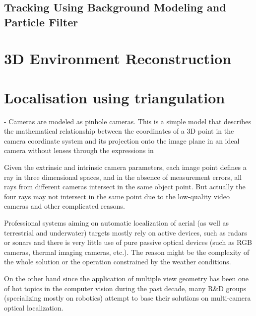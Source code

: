 \subsection{Tracking Using Background Modeling and Particle Filter}


\section{3D Environment Reconstruction}

\section{Localisation using triangulation}


- Cameras are modeled as pinhole cameras. This is a simple model that describes the mathematical
relationship between the coordinates of a 3D point in the camera coordinate system and its
projection onto the image plane in an ideal camera without lenses through the expressions in 


Given  the  extrinsic  and  intrinsic  camera 
parameters,  each  image  point  defines  a  ray  in  three 
dimensional spaces, and in the absence of measurement errors, 
all  rays  from  different  cameras  intersect  in  the  same  object 
point. But actually the four rays may not intersect in the same 
point  due  to  the  low-quality  video  cameras  and  other 
complicated  reasons.


Professional systems aiming on automatic localization of aerial (as well as terrestrial and underwater) targets mostly rely on active devices, such as radars or sonars and there is very little use of pure passive optical devices (such as RGB cameras, thermal imaging cameras, etc.). The reason might be the complexity of the whole solution or the operation constrained by the weather conditions.

On the other hand since the application of multiple view geometry has been one of hot topics in the computer vision during the past decade, many R\&D groups (specializing mostly on robotics) attempt to base their solutions on multi-camera optical localization.

